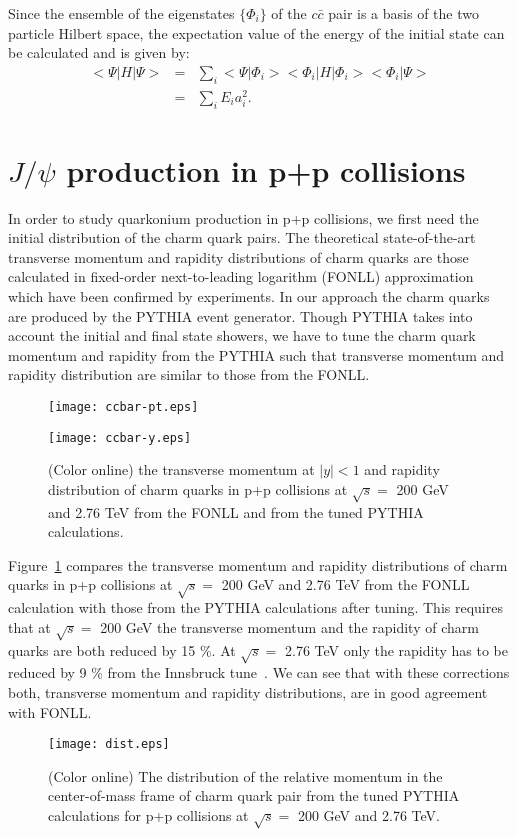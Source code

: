 \documentclass[twocolumn,aps,superscriptaddress,showpacs,nofootinbib,floatfix]{revtex4}
\newcommand{\bea}{\begin{eqnarray}}
\newcommand{\eea}{\end{eqnarray}}
\begin{document}
Since the ensemble of the eigenstates $\{\Phi_i\}$ of the $c \bar c$ pair is a basis of the two particle Hilbert space, the expectation value of the energy of the initial state can be calculated and is given by:
\bea
<\Psi|H|\Psi> &=& \sum_i<\Psi|\Phi_i><\Phi_i|H|\Phi_i><\Phi_i|\Psi>\nonumber \\
& =& \sum_i  E_i  a_i^2.
\eea


\section{$J/\psi$ production in p+p collisions}\label{pp}

In order to study quarkonium production in p+p collisions, we first need the initial distribution of the charm quark pairs.
The theoretical state-of-the-art transverse momentum and rapidity distributions of charm quarks are those calculated in fixed-order next-to-leading logarithm (FONLL) approximation~\cite{Cacciari:1998it,Cacciari:2001td} which have been confirmed by experiments.
In our approach the charm quarks are produced by the PYTHIA event generator. Though  PYTHIA takes into account the initial and final state showers, we have to tune the charm quark momentum and rapidity from the PYTHIA such that transverse momentum and rapidity distribution are similar to those from the FONLL.

\begin{figure}[!h]
\centerline{
\texttt{[image: ccbar-pt.eps]}}
\centerline{
\texttt{[image: ccbar-y.eps]}}
\caption{(Color online) the transverse momentum at $|y|<1$ and rapidity distribution of charm quarks in p+p collisions at $\sqrt{s}=$ 200 GeV and 2.76 TeV from the FONLL and from the tuned PYTHIA calculations.}
\label{ccbar}
\end{figure}


Figure~\ref{ccbar} compares the transverse momentum and rapidity distributions of charm quarks in p+p collisions at $\sqrt{s}=$ 200 GeV and 2.76 TeV from the FONLL calculation with those from the PYTHIA calculations after tuning. This requires
that at $\sqrt{s}=$ 200 GeV the transverse momentum and the rapidity of charm quarks are both reduced by 15 \%.
At $\sqrt{s}=$ 2.76 TeV only the rapidity has to be reduced by 9 \% from the Innsbruck tune~\cite{Song:2015sfa,Song:2015ykw}. We can see that with these corrections both, transverse momentum and rapidity distributions, are in good agreement with FONLL.

\begin{figure}[!h]
\centerline{
\texttt{[image: dist.eps]}}
\caption{(Color online) The distribution  of the relative momentum in the center-of-mass frame of charm quark pair from the tuned PYTHIA calculations for p+p collisions at $\sqrt{s}=$ 200 GeV and 2.76 TeV.}
\label{dist}
\end{figure}
\end{document}

